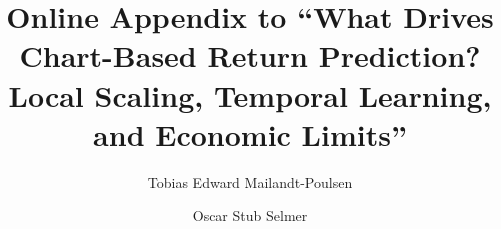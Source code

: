 \documentclass[final,1p,times,nonatbib]{elsarticle}
\newif\ifanonymous
\begin{document}
\begin{frontmatter}

\title{Online Appendix to ``What Drives Chart-Based Return Prediction? Local Scaling, Temporal Learning, and Economic Limits''}

\ifanonymous
\else
\author[au]{Tobias Edward Mailandt-Poulsen}
\author[au]{Oscar Stub Selmer}
\address[au]{Department of Economics and Business Economics, Aarhus University, Universitetsbyen 51, 8000 Aarhus C, Denmark}
\fi

\end{frontmatter}

\appendix

\end{document}
